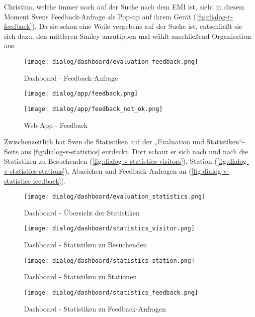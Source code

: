 Christina, welche immer noch auf der Suche nach dem EMI ist, sieht in diesem
Moment Svens Feedback-Anfrage als Pop-up auf ihrem Gerät (\autoref{fig:dialog-t-feedback}). Da sie schon eine Weile vergebens auf der
Suche ist, entschließt sie sich dazu, den mittleren Smiley anzutippen und wählt
anschließend Organisation aus.

\begin{figure}[hp]
    \centering
    \texttt{[image: dialog/dashboard/evaluation\_feedback.png]}
    \caption{Dashboard - Feedback-Anfrage}
    \label{fig:dialog-v-feedback}
\end{figure}

\begin{figure}[hp]
    \centering
    \begin{minipage}{.5\textwidth}
        \centering
        \texttt{[image: dialog/app/feedback.png]}
    \end{minipage}%
    \begin{minipage}{.5\textwidth}
        \centering
        \texttt{[image: dialog/app/feedback\_not\_ok.png]}
    \end{minipage}
    \caption{Web-App - Feedback}
    \label{fig:dialog-t-feedback}
\end{figure}

Zwischenzeitlich hat Sven die Statistiken auf der „Evaluation und
Statistiken“-Seite aus \autoref{fig:dialog-v-statistics} entdeckt. Dort schaut
er sich nach und nach die Statistiken zu Besuchenden (\autoref{fig:dialog-v-statistics-visitors}), Station (\autoref{fig:dialog-v-statistics-stations}), Abzeichen und Feedback-Anfragen an
(\autoref{fig:dialog-v-statistics-feedback}).

\begin{figure}[hp]
    \centering
    \texttt{[image: dialog/dashboard/evaluation\_statistics.png]}
    \caption{Dashboard - Übersicht der Statistiken}
    \label{fig:dialog-v-statistics}
\end{figure}

\begin{figure}[hp]
    \centering
    \texttt{[image: dialog/dashboard/statistics\_visitor.png]}
    \caption{Dashboard - Statistiken zu Besuchenden}
    \label{fig:dialog-v-statistics-visitors}
\end{figure}

\begin{figure}[hp]
    \centering
    \texttt{[image: dialog/dashboard/statistics\_station.png]}
    \caption{Dashboard - Statistiken zu Stationen}
    \label{fig:dialog-v-statistics-stations}
\end{figure}

\begin{figure}[hp]
    \centering
    \texttt{[image: dialog/dashboard/statistics\_feedback.png]}
    \caption{Dashboard - Statistiken zu Feedback-Anfragen}
    \label{fig:dialog-v-statistics-feedback}
\end{figure}